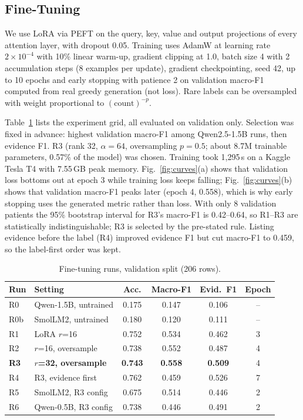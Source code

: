 \documentclass[conference]{IEEEtran}
\begin{document}
\subsection{Fine-Tuning}\label{sec:finetune}
We use LoRA \cite{hu2022lora} via PEFT \cite{peft} on the query, key, value and output projections of every attention layer, with dropout 0.05. Training uses AdamW at learning rate $2\times10^{-4}$ with 10\% linear warm-up, gradient clipping at 1.0, batch size 4 with 2 accumulation steps (8 examples per update), gradient checkpointing, seed 42, up to 10 epochs and early stopping with patience 2 on validation macro-F1 computed from real greedy generation (not loss). Rare labels can be oversampled with weight proportional to $(\text{count})^{-p}$.

Table~\ref{tab:runs} lists the experiment grid, all evaluated on validation only. Selection was fixed in advance: highest validation macro-F1 among Qwen2.5-1.5B runs, then evidence F1. R3 (rank 32, $\alpha=64$, oversampling $p=0.5$; about 8.7M trainable parameters, 0.57\% of the model) was chosen. Training took 1{,}295\,s on a Kaggle Tesla T4 with 7.55\,GB peak memory. Fig.~\ref{fig:curves}(a) shows that validation loss bottoms out at epoch 3 while training loss keeps falling; Fig.~\ref{fig:curves}(b) shows that validation macro-F1 peaks later (epoch 4, 0.558), which is why early stopping uses the generated metric rather than loss. With only 8 validation patients the 95\% bootstrap interval for R3's macro-F1 is 0.42--0.64, so R1--R3 are statistically indistinguishable; R3 is selected by the pre-stated rule. Listing evidence before the label (R4) improved evidence F1 but cut macro-F1 to 0.459, so the label-first order was kept.

\begin{table}[t]
\centering
\caption{Fine-tuning runs, validation split (206 rows).}
\label{tab:runs}
\setlength{\tabcolsep}{3pt}
\begin{tabular}{llcccc}
\toprule
Run & Setting & Acc. & Macro-F1 & Evid.\ F1 & Epoch \\
\midrule
R0 & Qwen-1.5B, untrained & 0.175 & 0.147 & 0.106 & -- \\
R0b & SmolLM2, untrained & 0.180 & 0.120 & 0.111 & -- \\
R1 & LoRA $r$=16 & 0.752 & 0.534 & 0.462 & 3 \\
R2 & $r$=16, oversample & 0.738 & 0.552 & 0.487 & 4 \\
\textbf{R3} & \textbf{$r$=32, oversample} & \textbf{0.743} & \textbf{0.558} & \textbf{0.509} & 4 \\
R4 & R3, evidence first & 0.762 & 0.459 & 0.526 & 7 \\
R5 & SmolLM2, R3 config & 0.675 & 0.514 & 0.446 & 2 \\
R6 & Qwen-0.5B, R3 config & 0.738 & 0.446 & 0.491 & 2 \\
\bottomrule
\end{tabular}
\end{table}
\end{document}
